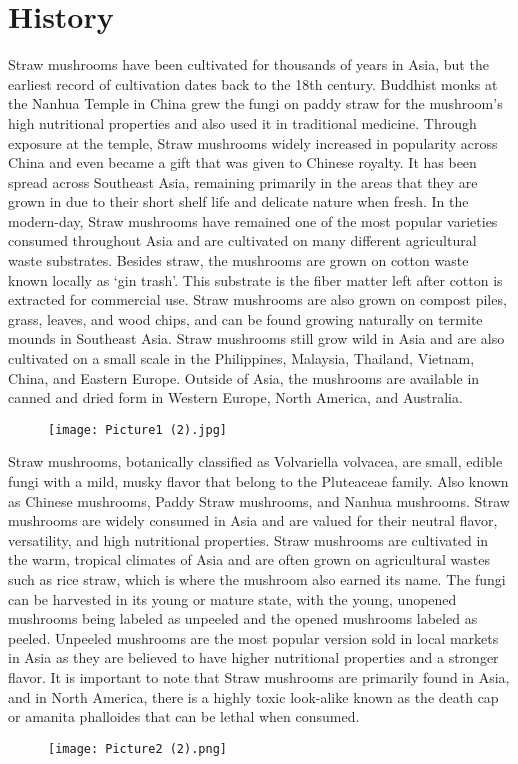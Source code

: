 \chapter{History}
\fontsize{16pt}{16pt}\normalfont

Straw mushrooms have been cultivated for thousands of years in Asia, but the earliest record of cultivation dates back to the 18th century. Buddhist monks at the Nanhua Temple in China grew the fungi on paddy straw for the mushroom's high nutritional properties and also used it in traditional medicine. Through exposure at the temple, Straw mushrooms widely increased in popularity across China and even became a gift that was given to Chinese royalty. It has been spread across Southeast Asia, remaining primarily in the areas that they are grown in due to their short shelf life and delicate nature when fresh.
\medbreak
In the modern-day, Straw mushrooms have remained one of the most popular varieties consumed throughout Asia and are cultivated on many different agricultural waste substrates. Besides straw, the mushrooms are grown on cotton waste known locally as `gin trash'. This substrate is the fiber matter left after cotton is extracted for commercial use. Straw mushrooms are also grown on compost piles, grass, leaves, and wood chips, and can be found growing naturally on termite mounds in Southeast Asia. Straw mushrooms still grow wild in Asia and are also cultivated on a small scale in the Philippines, Malaysia, Thailand, Vietnam, China, and Eastern Europe. Outside of Asia, the mushrooms are available in canned and dried form in Western Europe, North America, and Australia.
\medbreak
\begin{figure}[h]
    \texttt{[image: Picture1 (2).jpg]}
\end{figure}
Straw mushrooms, botanically classified as Volvariella volvacea, are small, edible fungi with a mild, musky flavor that belong to the Pluteaceae family. Also known as Chinese mushrooms, Paddy Straw mushrooms, and Nanhua mushrooms. Straw mushrooms are widely consumed in Asia and are valued for their neutral flavor, versatility, and high nutritional properties. Straw mushrooms are cultivated in the warm, tropical climates of Asia and are often grown on agricultural wastes such as rice straw, which is where the mushroom also earned its name. The fungi can be harvested in its young or mature state, with the young, unopened mushrooms being labeled as unpeeled and the opened mushrooms labeled as peeled. Unpeeled mushrooms are the most popular version sold in local markets in Asia as they are believed to have higher nutritional properties and a stronger flavor. It is important to note that Straw mushrooms are primarily found in Asia, and in North America, there is a highly toxic look-alike known as the death cap or amanita phalloides that can be lethal when consumed.\par
\begin{figure}[h]
    \texttt{[image: Picture2 (2).png]}
\end{figure}